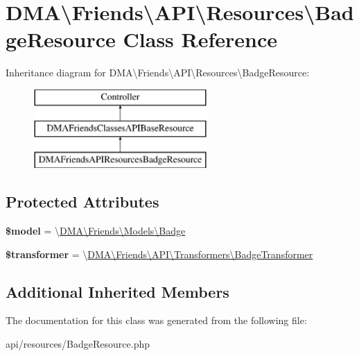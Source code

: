 \hypertarget{classDMA_1_1Friends_1_1API_1_1Resources_1_1BadgeResource}{}\section{D\+M\+A\textbackslash{}Friends\textbackslash{}A\+P\+I\textbackslash{}Resources\textbackslash{}Badge\+Resource Class Reference}
\label{classDMA_1_1Friends_1_1API_1_1Resources_1_1BadgeResource}
Inheritance diagram for D\+M\+A\textbackslash{}Friends\textbackslash{}A\+P\+I\textbackslash{}Resources\textbackslash{}Badge\+Resource\+:\begin{figure}[H]
\begin{center}
\leavevmode
\includegraphics[height=3.000000cm]{d6/dfa/classDMA_1_1Friends_1_1API_1_1Resources_1_1BadgeResource}
\end{center}
\end{figure}
\subsection*{Protected Attributes}
\begin{DoxyCompactItemize}
\item 
\hypertarget{classDMA_1_1Friends_1_1API_1_1Resources_1_1BadgeResource_ad6a4fa165af1929b00b17da3f700ad8c}{}{\bfseries \$model} = \textquotesingle{}\textbackslash{}\hyperlink{classDMA_1_1Friends_1_1Models_1_1Badge}{D\+M\+A\textbackslash{}\+Friends\textbackslash{}\+Models\textbackslash{}\+Badge}\textquotesingle{}\label{classDMA_1_1Friends_1_1API_1_1Resources_1_1BadgeResource_ad6a4fa165af1929b00b17da3f700ad8c}

\item 
\hypertarget{classDMA_1_1Friends_1_1API_1_1Resources_1_1BadgeResource_a4f1995ea5e1d81c54cee27c823d54884}{}{\bfseries \$transformer} = \textquotesingle{}\textbackslash{}\hyperlink{classDMA_1_1Friends_1_1API_1_1Transformers_1_1BadgeTransformer}{D\+M\+A\textbackslash{}\+Friends\textbackslash{}\+A\+P\+I\textbackslash{}\+Transformers\textbackslash{}\+Badge\+Transformer}\textquotesingle{}\label{classDMA_1_1Friends_1_1API_1_1Resources_1_1BadgeResource_a4f1995ea5e1d81c54cee27c823d54884}

\end{DoxyCompactItemize}
\subsection*{Additional Inherited Members}


The documentation for this class was generated from the following file\+:\begin{DoxyCompactItemize}
\item 
api/resources/Badge\+Resource.\+php\end{DoxyCompactItemize}
